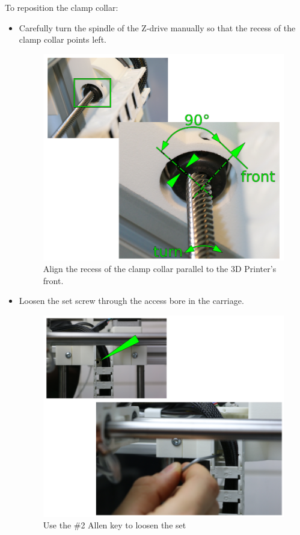 To reposition the clamp collar:

\begin{itemize}
  \item Carefully turn the spindle of the Z-drive manually so that the recess of the clamp collar points left.
    
    \begin{figure}[H]
      \centering
      \includegraphics[width=.7\linewidth]{./img/mtc_z-axis_alignclampcollar.png}
      \caption{Align the recess of the clamp collar parallel to the 3D Printer's front.}
    \end{figure}

  \item Loosen the set screw through the access bore in the carriage.

    \begin{figure}[H]
      \centering
      \includegraphics[width=.7\linewidth]{./img/mtc_z-axis_loosensetscrew.png}
      \caption{Use the \#2 Allen key to loosen the set}
    \end{figure}


\end{itemize}
